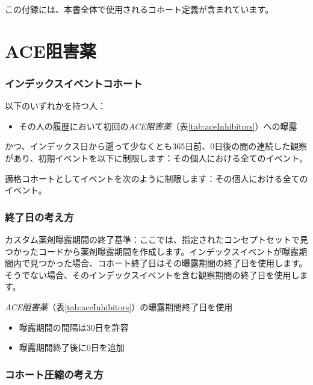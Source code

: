 \documentclass[
  11pt]{book}
\providecommand{\tightlist}{%
  \setlength{\itemsep}{0pt}\setlength{\parskip}{0pt}}
\theoremstyle{definition}
\theoremstyle{definition}
\theoremstyle{definition}
\theoremstyle{definition}
\theoremstyle{remark}
\begin{document}
この付録には、本書全体で使用されるコホート定義が含まれています。

\section{ACE阻害薬}\label{AceInhibitors}

\subsubsection*{インデックスイベントコホート}\label{ux30a4ux30f3ux30c7ux30c3ux30afux30b9ux30a4ux30d9ux30f3ux30c8ux30b3ux30dbux30fcux30c8}

以下のいずれかを持つ人：

\begin{itemize}
\tightlist
\item
  その人の履歴において初回の\emph{ACE阻害薬}（表\ref{tab:aceInhibitors}）への曝露
\end{itemize}

かつ、インデックス日から遡って少なくとも365日前、0日後の間の連続した観察があり、初期イベントを以下に制限します：その個人における全てのイベント。

適格コホートとしてイベントを次のように制限します：その個人における全てのイベント。

\subsubsection*{終了日の考え方}\label{ux7d42ux4e86ux65e5ux306eux8003ux3048ux65b9}

カスタム薬剤曝露期間の終了基準：ここでは、指定されたコンセプトセットで見つかったコードから薬剤曝露期間を作成します。インデックスイベントが曝露期間内で見つかった場合、コホート終了日はその曝露期間の終了日を使用します。そうでない場合、そのインデックスイベントを含む観察期間の終了日を使用します。

\emph{ACE阻害薬}（表\ref{tab:aceInhibitors}）の曝露期間終了日を使用

\begin{itemize}
\tightlist
\item
  曝露期間の間隔は30日を許容
\item
  曝露期間終了後に0日を追加
\end{itemize}

\subsubsection*{コホート圧縮の考え方}\label{ux30b3ux30dbux30fcux30c8ux5727ux7e2eux306eux8003ux3048ux65b9}
\end{document}
